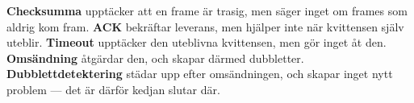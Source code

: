 \textbf{Checksumma} upptäcker att en frame är trasig, men säger inget om frames som aldrig kom
fram. \textbf{ACK} bekräftar leverans, men hjälper inte när kvittensen själv uteblir.
\textbf{Timeout} upptäcker den uteblivna kvittensen, men gör inget åt den. \textbf{Omsändning}
åtgärdar den, och skapar därmed dubbletter. \textbf{Dubblettdetektering} städar upp efter
omsändningen, och skapar inget nytt problem --- det är därför kedjan slutar där.
